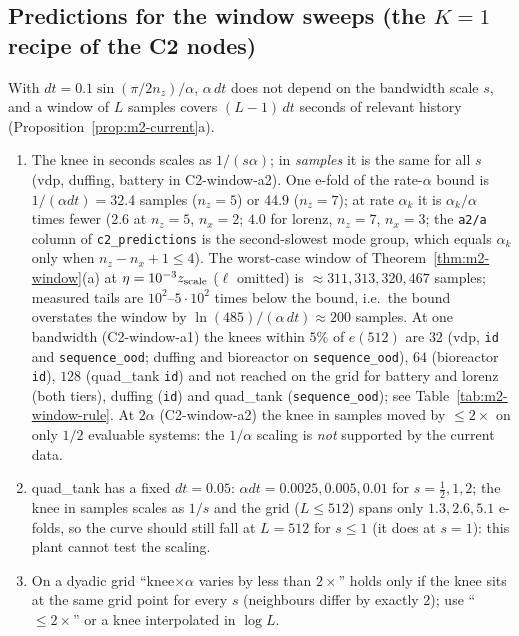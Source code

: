\subsection{Predictions for the window sweeps (the $K=1$ recipe of the C2 nodes)}
With $dt=0.1\sin(\pi/2n_z)/\alpha$, $\alpha\,dt$ does not depend on the bandwidth scale $s$, and a window of $L$
samples covers $(L-1)\,dt$ seconds of relevant history (Proposition~\ref{prop:m2-current}a).
\begin{enumerate}
\item The knee in seconds scales as $1/(s\alpha)$; in \emph{samples} it is the same for all $s$ (vdp, duffing,
battery in C2-window-a2). One e-fold of the rate-$\alpha$ bound is $1/(\alpha dt)=32.4$ samples ($n_z=5$) or
$44.9$ ($n_z=7$); at rate $\alpha_k$ it is $\alpha_k/\alpha$ times fewer ($2.6$ at $n_z=5$, $n_x=2$; $4.0$ for lorenz,
$n_z=7$, $n_x=3$; the \texttt{a2/a} column of \texttt{c2\_predictions} is the second-slowest mode group, which equals
$\alpha_k$ only when $n_z-n_x+1\le4$). The worst-case window of
Theorem~\ref{thm:m2-window}(a) at $\eta=10^{-3}z_{\rm scale}$ ($\ell$ omitted) is $\approx311,313,320,467$ samples;
measured tails are $10^2$--$5\cdot10^2$ times below the bound, i.e.\ the bound overstates the window by
$\ln(485)/(\alpha\,dt)\approx200$ samples. At one bandwidth (C2-window-a1) the knees within $5\%$ of $e(512)$ are $32$ (vdp,
\texttt{id} and \texttt{sequence\_ood}; duffing and bioreactor on \texttt{sequence\_ood}), $64$ (bioreactor \texttt{id}),
$128$ (quad\_tank \texttt{id}) and not reached on the grid for battery and lorenz (both tiers), duffing (\texttt{id}) and
quad\_tank (\texttt{sequence\_ood}); see Table~\ref{tab:m2-window-rule}. At $2\alpha$ (C2-window-a2) the knee in samples
moved by $\le2\times$ on only $1/2$ evaluable systems: the $1/\alpha$ scaling is \emph{not} supported by the current data.
\item quad\_tank has a fixed $dt=0.05$: $\alpha dt=0.0025,0.005,0.01$ for $s=\tfrac12,1,2$; the knee in samples scales as
$1/s$ and the grid ($L\le512$) spans only $1.3,2.6,5.1$ e-folds, so the curve should still fall at $L=512$ for
$s\le1$ (it does at $s=1$): this plant cannot test the scaling.
\item On a dyadic grid ``knee$\times\alpha$ varies by less than $2\times$'' holds only if the knee sits at the same grid
point for every $s$ (neighbours differ by exactly $2$); use ``$\le2\times$'' or a knee interpolated in $\log L$.
\end{enumerate}


